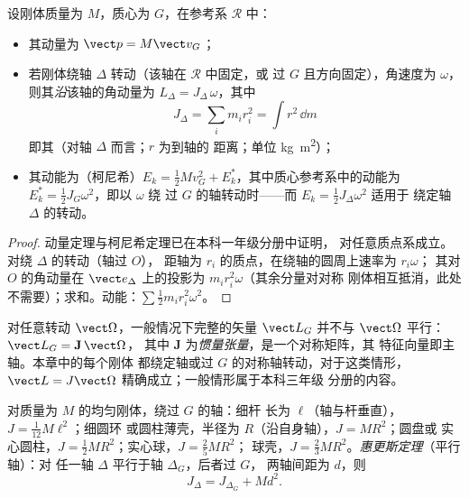 \begin{proposition}[动量、角动量、动能]\label{prop:b2:rigid-body-mechanics:kinetic}
设刚体质量为 $M$，质心为 $G$，在参考系 $\mathcal R$ 中：
\begin{itemize}
  \item 其动量为 $\vect p = M\vect v_G$；
  \item 若刚体绕轴 $\Delta$ 转动（该轴在 $\mathcal R$ 中固定，或
        过 $G$ 且方向固定），角速度为
        $\omega$，则其\emph{沿}该轴的角动量为
        $L_\Delta = J_\Delta\,\omega$，其中
        \[
        J_\Delta = \sum_i m_i r_i^2 = \int r^2\,\dd m
        \]
        即其\emph{}（对轴 $\Delta$ 而言；$r$ 为到轴的
        距离；单位 \unit{kg.m^2}）；
  \item 其动能为（柯尼希）$E_k = \tfrac12Mv_G^2 +
        E_k^*$，其中质心参考系中的动能为
        $E_k^* = \tfrac12J_{G}\omega^2$，即以 $\omega$ 绕
        过 $G$ 的轴转动时——而 $E_k = \tfrac12J_\Delta\omega^2$ 适用于
        绕定轴 $\Delta$ 的转动。
\end{itemize}
\end{proposition}

\begin{proof}
动量定理与柯尼希定理已在本科一年级分册中证明，
对任意质点系成立。对绕 $\Delta$ 的转动（轴过 $O$），
距轴为 $r_i$ 的质点，在绕轴的圆周上速率为 $r_i\omega$；
其对 $O$ 的角动量在 $\vect e_\Delta$ 上的投影为
$m_ir_i^2\omega$（其余分量对对称
刚体相互抵消，此处不需要）；求和。动能：$\sum\tfrac12m_ir_i^2
\omega^2$。
\end{proof}

\begin{remark}[在本阶段不加证明地承认]\label{rem:b2:rigid-body-mechanics:tensor}
对任意转动 $\vect\Omega$，一般情况下完整的矢量 $\vect L_G$
并不与 $\vect\Omega$ 平行：$\vect L_G = \mathbf J\,\vect\Omega$，
其中 $\mathbf J$ 为\emph{惯量张量}，是一个对称矩阵，其
特征向量即主轴。本章中的每个刚体
都绕定轴或过 $G$ 的对称轴转动，对于这类情形，
$\vect L = J\vect\Omega$ 精确成立；一般情形属于本科三年级
分册的内容。
\end{remark}

\begin{proposition}[转动惯量]\label{prop:b2:rigid-body-mechanics:inertia}
对质量为 $M$ 的均匀刚体，绕过 $G$ 的轴：细杆
长为 $\ell$（轴与杆垂直），$J = \tfrac1{12}M\ell^2$；细圆环
或圆柱薄壳，半径为 $R$（沿自身轴），$J = MR^2$；圆盘或
实心圆柱，$J = \tfrac12MR^2$；实心球，$J = \tfrac25MR^2$；
球壳，$J = \tfrac23MR^2$。\emph{惠更斯定理}（平行轴）：对
任一轴 $\Delta$ 平行于轴 $\Delta_G$，后者过 $G$，
两轴间距为 $d$，则
\[
J_\Delta = J_{\Delta_G} + Md^2 .
\]
\end{proposition}

